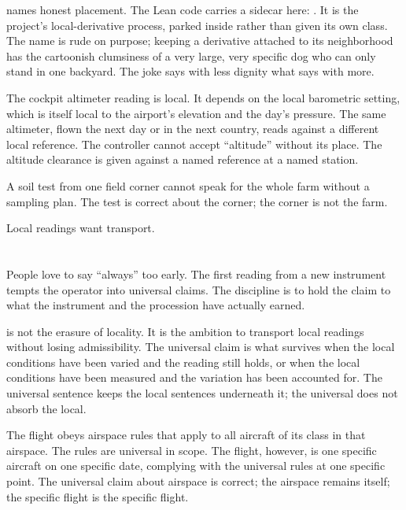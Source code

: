 names honest placement. The Lean code carries a sidecar
here: . It is the project's local-derivative
process, parked inside  rather than given its own class.
The name is rude on purpose; keeping a derivative attached to its
neighborhood has the cartoonish clumsiness of a very large, very
specific dog who can only stand in one backyard. The joke says with
less dignity what  says with more.

The cockpit altimeter reading is local. It depends on the local
barometric setting, which is itself local to the airport's elevation
and the day's pressure. The same altimeter, flown the next day or in
the next country, reads against a different local reference. The
controller cannot accept ``altitude'' without its place. The altitude
clearance is given against a named reference at a named station.

A soil test from one field corner cannot speak for the whole farm
without a sampling plan. The test is correct about the corner; the
corner is not the farm.

Local readings want transport.

\section{}
\label{se:universal}

People love to say ``always'' too early. The first reading from a new
instrument tempts the operator into universal claims. The discipline
is to hold the claim to what the instrument and the procession have
actually earned.

 is not the erasure of locality. It is the ambition to
transport local readings without losing admissibility. The universal
claim is what survives when the local conditions have been varied and
the reading still holds, or when the local conditions have been
measured and the variation has been accounted for. The universal
sentence keeps the local sentences underneath it; the universal does
not absorb the local.

The flight obeys airspace rules that apply to all aircraft of its
class in that airspace. The rules are universal in scope. The flight,
however, is one specific aircraft on one specific date, complying
with the universal rules at one specific point. The universal claim
about airspace is correct; the airspace remains itself; the specific
flight is the specific flight.

